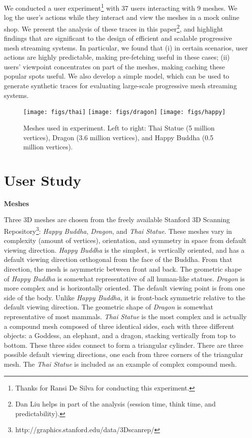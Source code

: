 We conducted a user experiment\footnote{Thanks for Ransi De Silva for conducting this experiment.}
with 37 users interacting with 9 meshes.
We log the user's actions while they interact and view the meshes in a mock online shop.  
We present the analysis of these traces in this paper\footnote{Dan Liu helps in part of the analysis (session time,
think time, and predictability).}, 
and highlight findings that are significant to the design of efficient 
and scalable progressive mesh streaming systems.  
In particular, we found that 
(i) in certain scenarios, user actions are highly predictable, making pre-fetching useful in these cases; 
(ii) users' viewpoint concentrates on part of the meshes, making caching these popular spots useful. 
We also develop a simple model, which can be used to generate synthetic traces for evaluating large-scale progressive mesh streaming systems.
\begin{figure}[htp]
\centering
\texttt{[image: figs/thai]}
\texttt{[image: figs/dragon]}
\texttt{[image: figs/happy]} 
\caption{Meshes used in experiment.  Left to right: 
Thai Statue (5 million vertices), Dragon (3.6 million vertices), and Happy Buddha (0.5 million vertices).}
\label{fig:3dmodels}
\end{figure}

\section{User Study}
\label{s:user:study}
\textbf{Meshes}

Three 3D meshes are chosen from the freely available
Stanford 3D Scanning Repository\footnote{http://graphics.stanford.edu/data/3Dscanrep/}:
\textit{Happy Buddha}, \textit{Dragon}, and \textit{Thai Statue}.
These meshes vary in complexity (amount of vertices), orientation, and
symmetry in space from default viewing direction. \textit{Happy Buddha} is the
simplest, is vertically oriented, and has a default viewing direction
orthogonal from the face of the Buddha. From that direction, the mesh is
asymmetric between front and back. The geometric shape of \textit{Happy Buddha} is
somewhat representative of all human-like statues. \textit{Dragon} is more complex
and is horizontally oriented. The default viewing point is from one
side of the body. Unlike \textit{Happy Buddha}, it is front-back symmetric
relative to the default viewing direction. The geometric shape of \textit{Dragon} is
somewhat representative of most mammals. \textit{Thai Statue} is the most complex
and is actually a compound mesh composed of three identical sides, each 
with three different objects: a Goddess, an elephant, and a dragon,
stacking vertically from top to bottom.  These three sides connect to
form a triangular cylinder. There are three possible default
viewing directions, one each from three corners of the triangular mesh. The
\textit{Thai Statue} is included as an example of complex compound mesh.

